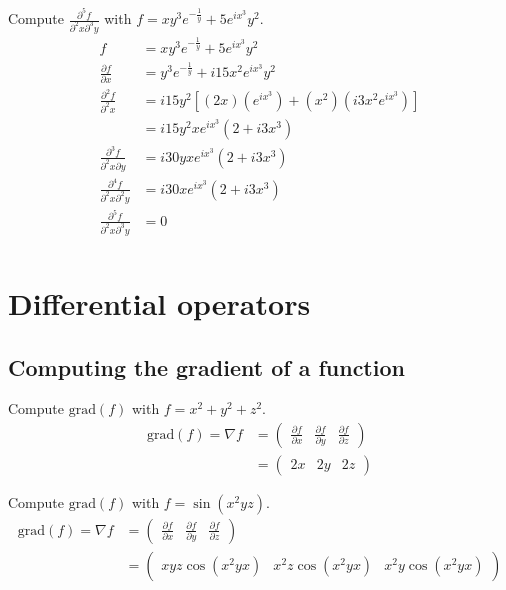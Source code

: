   Compute $\frac{\partial^5f}{\partial^2x\partial^3y}$ with $f = xy^3e^{-\frac{1}{y}} + 5e^{ix^3}y^2$.
  \begin{align*}
    f                                           & = xy^3e^{-\frac{1}{y}} + 5e^{ix^3}y^2 \\
    \frac{\partial f}{\partial x}               & = y^3e^{-\frac{1}{y}} + i15x^2e^{ix^3}y^2\\
    \frac{\partial^2f}{\partial^2x}             & = i15y^2[(2x)(e^{ix^3}) + (x^2)(i3x^2e^{ix^3})]\\
                                                & = i15y^2xe^{ix^3}(2 + i3x^3)\\
    \frac{\partial^3f}{\partial^2x\partial y}   & = i30yxe^{ix^3}(2 + i3x^3) \\
    \frac{\partial^4f}{\partial^2x\partial^2y}  & = i30xe^{ix^3}(2 + i3x^3) \\
    \frac{\partial^5f}{\partial^2x\partial^3y}  & = 0 \\
  \end{align*}

\section{Differential operators}
  

  \subsection{Computing the gradient of a function}
  Compute $\text{grad}(f)$ with $f = x^2 + y^2 + z^2$.
  \begin{align*}
    \text{grad}(f) = \nabla f 
      & = \begin{pmatrix} 
            \frac{\partial f}{\partial x} &
            \frac{\partial f}{\partial y} &
            \frac{\partial f}{\partial z}
          \end{pmatrix} \\
      & = \begin{pmatrix}
            2x & 2y & 2z
          \end{pmatrix}
  \end{align*}

  Compute $\text{grad}(f)$ with $f = \sin(x^2yz)$.
  \begin{align*}
    \text{grad}(f) = \nabla f 
      & = \begin{pmatrix} 
            \frac{\partial f}{\partial x} &
            \frac{\partial f}{\partial y} &
            \frac{\partial f}{\partial z}
          \end{pmatrix} \\
      & = \begin{pmatrix}
            xyz\cos(x^2yx) & 
            x^2z\cos(x^2yx) &
            x^2y\cos(x^2yx)
          \end{pmatrix}
  \end{align*}

